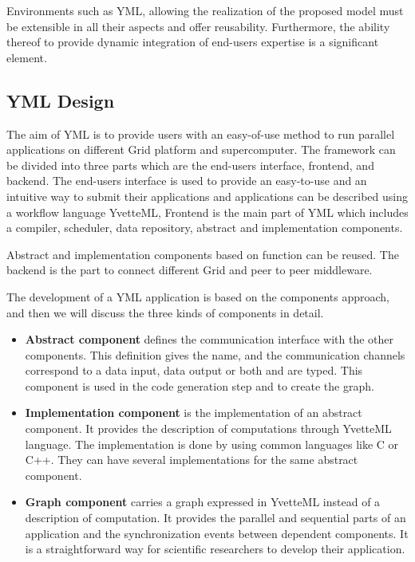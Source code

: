 Environments such as YML, allowing the realization of the proposed model must be extensible in all their aspects and offer reusability. Furthermore, the ability thereof to provide dynamic integration of end-users expertise is a significant element.

\subsection{YML Design}

The aim of YML is to provide users with an easy-of-use method to run parallel applications on different Grid platform and supercomputer. The framework can be divided into three parts which are the end-users interface, frontend, and backend. The end-users interface is used to provide an easy-to-use and an intuitive way to submit their applications and applications can be described using a workflow language YvetteML, Frontend is the main part of YML which includes a compiler, scheduler, data repository, abstract and implementation components.

Abstract and implementation components based on function can be reused. The backend is the part to connect different Grid and peer to peer middleware.

The development of a YML application is based on the components approach, and then we will discuss the three kinds of components in detail.

\begin{itemize}
	\item \textbf{Abstract component} defines the communication interface with the other components. This definition gives the name, and the communication channels correspond to a data input, data output or both and are typed. This component is used in the code generation step and to create the graph.
	
	\item \textbf{Implementation component} is the implementation of an abstract component. It provides the description of computations through YvetteML language. The implementation is done by using common languages like C or C++. They can have several implementations for the same abstract component.
	
	\item \textbf{Graph component} carries a graph expressed in YvetteML instead of a description of computation. It provides the parallel and sequential parts of an application and the synchronization events between dependent components. It is a straightforward way for scientific researchers to develop their application.
\end{itemize}

